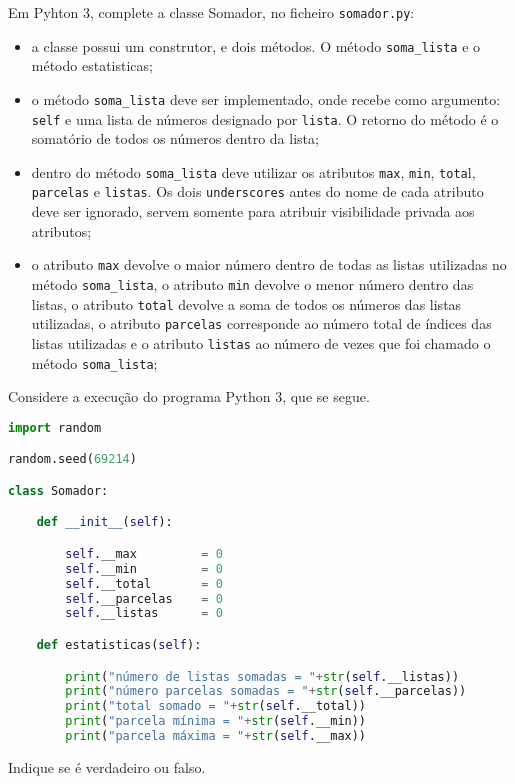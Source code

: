 \documentclass[12pt,varwidth=16cm,border=17pt]{standalone}
\begin{document}
Em Pyhton 3, complete a classe Somador, no ficheiro \verb+somador.py+:

\begin{itemize}
  \item a classe possui um construtor, e dois métodos. O método \verb+soma_lista+ e o método estatisticas;
  \item o método \verb+soma_lista+ deve ser implementado, onde recebe como argumento: \verb+self+ e uma lista de números designado por \verb+lista+. O retorno do método é o somatório de todos os números dentro da lista;
  \item dentro do método \verb+soma_lista+ deve utilizar os atributos \verb+max+, \verb+min+, \verb+tota+l, \verb+parcelas+ e \verb+listas+. Os dois \verb+underscores+ antes do nome de cada atributo deve ser ignorado, servem somente para atribuir visibilidade privada aos atributos;
  \item o atributo \verb+max+ devolve o maior número dentro de todas as listas utilizadas no método \verb+soma_lista+, o atributo \verb+min+ devolve o menor número dentro das listas, o atributo \verb+total+ devolve a soma de todos os números das listas utilizadas, o atributo \verb+parcelas+ corresponde ao número total de índices das listas utilizadas e o atributo \verb+listas+ ao número de vezes que foi chamado o método \verb+soma_lista+;
\end{itemize}

Considere a execução do programa Python 3, que se segue. 

\begin{lstlisting}[language=Python]
import random

random.seed(69214)

class Somador:

	def __init__(self):

		self.__max         = 0
		self.__min         = 0
		self.__total       = 0
		self.__parcelas    = 0
		self.__listas      = 0

	def estatisticas(self):

		print("número de listas somadas = "+str(self.__listas))
		print("número parcelas somadas = "+str(self.__parcelas))
		print("total somado = "+str(self.__total))
		print("parcela mínima = "+str(self.__min))
		print("parcela máxima = "+str(self.__max))
\end{lstlisting}

Indique se é verdadeiro ou falso.
\end{document}
